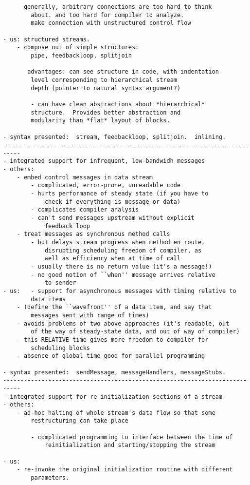 \begin{verbatim}
	  generally, arbitrary connections are too hard to think
		about. and too hard for compiler to analyze.
		make connection with unstructured control flow

- us: structured streams.
	- compose out of simple structures:  
		pipe, feedbackloop, splitjoin

	   advantages: can see structure in code, with indentation
		level corresponding to hierarchical stream
		depth (pointer to natural syntax argument?)

		- can have clean abstractions about *hierarchical*
		structure.  Provides better abstraction and
		modularity than *flat* layout of blocks.

- syntax presented:  stream, feedbackloop, splitjoin.  inlining.
---------------------------------------------------------------------------
- integrated support for infrequent, low-bandwidh messages
- others:
	- embed control messages in data stream
		- complicated, error-prone, unreadable code
		- hurts performance of steady state (if you have to 
			check if everything is message or data)
		- complicates compiler analysis
		- can't send messages upstream without explicit
			feedback loop
	- treat messages as synchronous method calls
		- but delays stream progress when method en route, 
			disrupting scheduling freedom of compiler, as
			well as efficiency when at time of call
		- usually there is no return value (it's a message!)
		- no good notion of ``when'' message arrives relative
			to sender
- us: 	- support for asynchronous messages with timing relative to
		data items
	- (define the ``wavefront'' of a data item, and say that
		messages sent with range of times)
	- avoids problems of two above approaches (it's readable, out
		of the way of steady-state data, and out of way of compiler)
	- this RELATIVE time gives more freedom to compiler for
		scheduling blocks
	- absence of global time good for parallel programming

- syntax presented:  sendMessage, messageHandlers, messageStubs.
---------------------------------------------------------------------------
- integrated support for re-initialization sections of a stream
- others:	
	- ad-hoc halting of whole stream's data flow so that some
		restructuring can take place
		
		- complicated programming to interface between the time of
			reinitialization and starting/stopping the stream

- us:
	- re-invoke the original initialization routine with different 
		parameters.


\end{verbatim}
